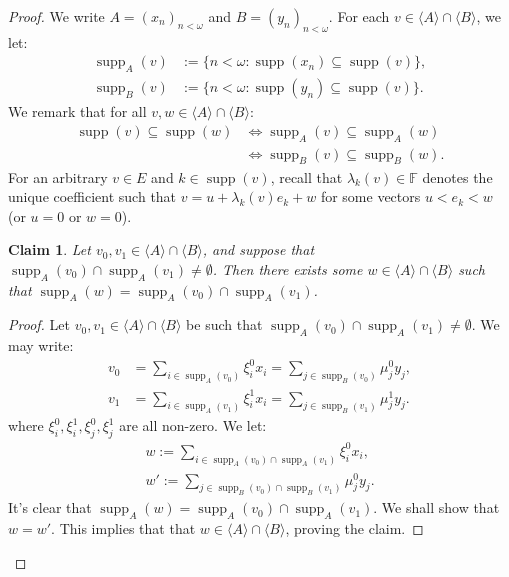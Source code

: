 \documentclass[10pt,a4paper]{amsart}
\theoremstyle{plain}
\numberwithin{equation}{section}
\newtheorem{claim}{Claim}
\theoremstyle{definition}
\newcommand{\func}{\operatorname}
\renewcommand{\c}[1]{\langle #1 \rangle}
\newcommand{\supp}{\func{supp}}
\newenvironment{midproof}[1][Proof]
  {\begin{proof}[#1]\renewcommand{\qedsymbol}{$\blacksquare$}}
  {\end{proof}}
\begin{document}
\begin{proof}
    We write $A = (x_n)_{n<\omega}$ and $B = (y_n)_{n<\omega}$. For each $v \in \c{A} \cap \c{B}$, we let:
    \begin{align*}
        \supp_A(v) &:= \{n < \omega : \supp(x_n) \subseteq \supp(v)\}, \\
        \supp_B(v) &:= \{n < \omega : \supp(y_n) \subseteq \supp(v)\}.
    \end{align*}
    We remark that for all $v,w \in \c{A} \cap \c{B}$:
    \begin{align*}
        \supp(v) \subseteq \supp(w) &\iff \supp_A(v) \subseteq \supp_A(w) \\
        &\iff \supp_B(v) \subseteq \supp_B(w).
    \end{align*}
    For an arbitrary $v \in E$ and $k \in \supp(v)$, recall that $\lambda_k(v) \in \mathbb{F}$ denotes the unique coefficient such that $v = u + \lambda_k(v)e_k + w$ for some vectors $u < e_k < w$ (or $u = 0$ or $w = 0$).

    \begin{claim}
    \label{claim:supp(v).intersection}
        Let $v_0,v_1 \in \c{A} \cap \c{B}$, and suppose that $\supp_A(v_0) \cap \supp_A(v_1) \neq \emptyset$. Then there exists some $w \in \c{A} \cap \c{B}$ such that $\supp_A(w) = \supp_A(v_0) \cap \supp_A(v_1)$.
    \end{claim}

    \begin{midproof}
        Let $v_0,v_1 \in \c{A} \cap \c{B}$ be such that $\supp_A(v_0) \cap \supp_A(v_1) \neq \emptyset$. We may write:
        \begin{align}
            v_0 &= \sum_{i \in \supp_A(v_0)} \xi_i^0x_i = \sum_{j \in \supp_B(v_0)} \mu_j^0y_j, \label{eq:v_0} \\
            v_1 &= \sum_{i \in \supp_A(v_1)} \xi_i^1x_i = \sum_{j \in \supp_B(v_1)} \mu_j^1y_j. \label{eq:v_1}
        \end{align}
        where $\xi_i^0,\xi_i^1,\xi_j^0,\xi_j^1$ are all non-zero. We let:
        \begin{align*}
            w := \sum_{i \in \supp_A(v_0) \cap \supp_A(v_1)} \xi_i^0 x_i, \\
            w' := \sum_{j \in \supp_B(v_0) \cap \supp_B(v_1)} \mu_j^0 y_j.
        \end{align*}
        It's clear that $\supp_A(w) = \supp_A(v_0) \cap \supp_A(v_1)$. We shall show that $w = w'$. This implies that that $w \in \c{A} \cap \c{B}$, proving the claim.


\end{midproof}
\end{proof}
\end{document}
